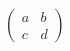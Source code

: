 \documentclass[preview]{standalone}
\begin{document}
\begin{center}
$ \begin{pmatrix} a & b \\ c & d \end{pmatrix} $
\end{center}
\end{document}
